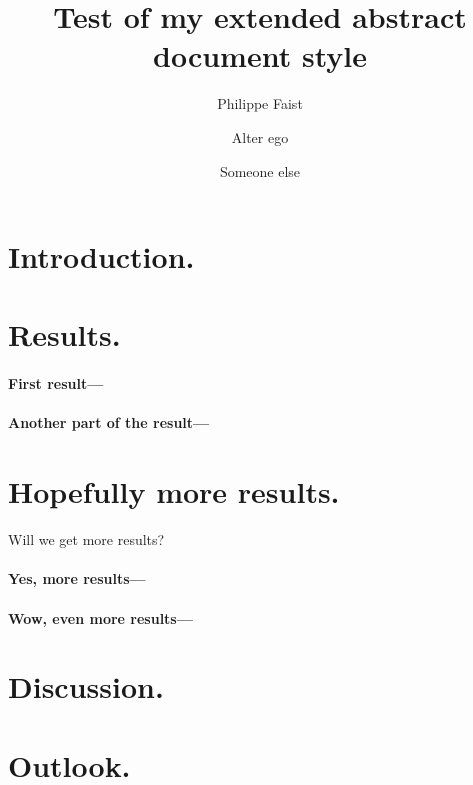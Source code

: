 \documentclass[
]{phfextendedabstract}
\begin{document}
\title{Test of my extended abstract document style}
\author{Philippe Faist}
\author{Alter ego}
\author{Someone else}
\maketitle


\section{Introduction.}
\lipsum[1]

\section{Results.}
\lipsum[2]

\paragraph{First result---}
\lipsum[3]

\paragraph{Another part of the result---}
\lipsum[4-5]

\section{Hopefully more results.}
Will we get more results?

\paragraph{Yes, more results---}
\lipsum[6]

\paragraph{Wow, even more results---}
\lipsum[7]

\section{Discussion.}
\lipsum[8]

\section{Outlook.}
\lipsum[9]
\end{document}
